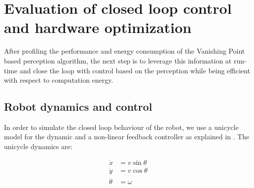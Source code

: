 \section{Evaluation of closed loop control and hardware optimization}
\label{sec:evaluation}
After profiling the performance and energy consumption of the Vanishing Point based perception algorithm, the next step is to leverage this information at run-time and close the loop with control based on the perception while being efficient with respect to computation energy.

%



\subsection{Robot dynamics and control}
\label{sec:robotDynamics}
In order to simulate the closed loop behaviour of the robot, we use a unicycle model for the dynamic and a non-linear feedback controller as explained in \cite{VP2}. The unicycle dynamics are:

\begin{subequations}
\begin{align}
\dot{x} &= v\sin\theta \nonumber \\
\dot{y} &= v\cos\theta \nonumber \\
\dot{\theta} &= \omega 
\end{align}
\label{eq:plant}
\end{subequations}


